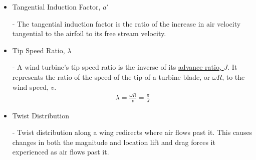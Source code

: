 \documentclass{article}
\begin{document}
\begin{itemize}
	\item \hypertarget{a'}{Tangential Induction Factor, $a'$} - The tangential induction factor is the ratio of the increase in air velocity tangential to the airfoil to its free stream velocity.
	
	\item \hypertarget{lambda}{Tip Speed Ratio, $\lambda$} - A wind turbine's tip speed ratio is the inverse of its \hyperlink{J}{advance ratio, $J$}. It represents the ratio of the speed of the tip of a turbine blade, or $\omega R$, to the wind speed, $v$.
	\begin{equation}
	\begin{aligned}
		\lambda = \frac{\omega R}{v} = \frac{\pi}{J}
	\end{aligned}
	\end{equation}
	
	\item \hypertarget{T}{Twist Distribution} - Twist distribution along a wing redirects where air flows past it. This causes changes in both the magnitude and location lift and drag forces it experienced as air flows past it.
	
\end{itemize}
\end{document}
